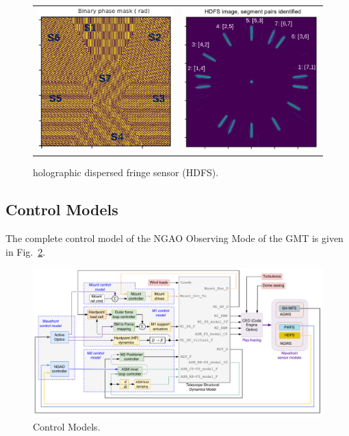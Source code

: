 \documentclass[]{AO4ELT}  %
\begin{document}
\begin{figure}
   \centering
   \begin{tabular}{cc}
      \includegraphics[width=0.4\linewidth]{hdfs_mask.png} &
      \includegraphics[width=0.4\linewidth]{hdfs_image.png}
   \end{tabular}
   \caption{holographic dispersed fringe sensor (HDFS).}
   \label{fig:14}
\end{figure}

\clearpage

\subsection{Control Models}
\label{sec:control}

The complete control model of the NGAO Observing Mode of the GMT is given in Fig.~\ref{fig:15}.

\begin{figure}
   \centering
   \includegraphics[width=\linewidth]{end2end_ngao-ngao-im-e2e.drawio.pdf}
   \caption{Control Models.}
   \label{fig:15}
\end{figure}
\end{document}

